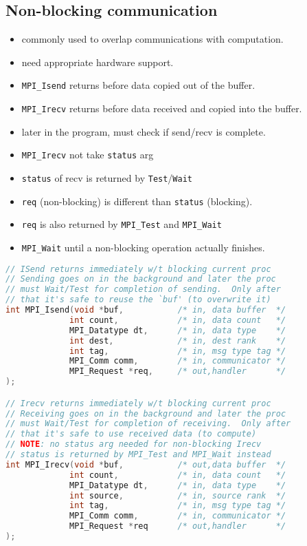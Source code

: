 \subsection*{Non-blocking communication}
\begin{itemize}
\item commonly used to overlap communications with computation.
\item need appropriate hardware support.
\item \texttt{MPI\_Isend} returns before data copied out of the buffer.
\item \texttt{MPI\_Irecv} returns before data received and copied into the buffer.
\item later in the program, must check if send/recv is complete.
\item \texttt{MPI\_Irecv} not take \texttt{status} arg
\item \texttt{status} of recv is returned by \texttt{Test}/\texttt{Wait}
\item \texttt{req} (non-blocking) is different than \texttt{status} (blocking).
\item \texttt{req} is also returned by \texttt{MPI\_Test} and \texttt{MPI\_Wait}
\item \texttt{MPI\_Wait} until a non-blocking operation actually finishes.
\end{itemize}
\begin{lstlisting}[language=c]
// ISend returns immediately w/t blocking current proc
// Sending goes on in the background and later the proc
// must Wait/Test for completion of sending.  Only after
// that it's safe to reuse the `buf' (to overwrite it)
int MPI_Isend(void *buf,           /* in, data buffer  */
             int count,            /* in, data count   */
             MPI_Datatype dt,      /* in, data type    */
             int dest,             /* in, dest rank    */
             int tag,              /* in, msg type tag */
             MPI_Comm comm,        /* in, communicator */
             MPI_Request *req,     /* out,handler      */
);

// Irecv returns immediately w/t blocking current proc
// Receiving goes on in the background and later the proc
// must Wait/Test for completion of receiving.  Only after
// that it's safe to use received data (to compute)
// NOTE: no status arg needed for non-blocking Irecv
// status is returned by MPI_Test and MPI_Wait instead
int MPI_Irecv(void *buf,           /* out,data buffer  */
             int count,            /* in, data count   */
             MPI_Datatype dt,      /* in, data type    */
             int source,           /* in, source rank  */
             int tag,              /* in, msg type tag */
             MPI_Comm comm,        /* in, communicator */
             MPI_Request *req      /* out,handler      */
);
\end{lstlisting}

